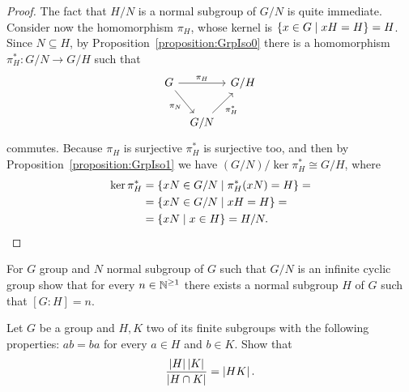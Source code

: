 \begin{proof}
The fact that \(H/N\) is a normal subgroup of \(G/N\) is quite immediate. Consider now the homomorphism \(\pi_H\), whose kernel is \(\left\{x \in G \mid xH = H\right\} = H\). Since \(N \subseteq H\), by Proposition~\ref{proposition:GrpIso0} there is a homomorphism \(\pi_H^\ast : G/N \to G/H\) such that
\[\begin{tikzcd}[column sep=tiny]
G \ar["{\pi_H}", rr] \ar["\pi_N", swap, dr] & & G/H \\
& G/N \ar["{\pi_H^\ast}", swap, ur]
\end{tikzcd}\]
commutes. Because \(\pi_H\) is surjective \(\pi_H^\ast\) is surjective too, and then by Proposition~\ref{proposition:GrpIso1} we have \((G/N)/\ker \pi_H^\ast \cong G/H\), where
\begin{align*}
\ker \pi_H^\ast &= \left\{xN \in G/N \mid \pi_H^\ast(xN) = H\right\} = \\
                &= \left\{xN \in G/N \mid xH = H\right\} = \\
                &= \left\{xN \mid x \in H\right\} = H/N .\qedhere
\end{align*}
\end{proof}

\begin{exercise}
For \(G\) group and \(N\) normal subgroup of \(G\) such that \(G/N\) is an infinite cyclic group show that for every \(n \in \mathbb N^{\ge 1}\) there exists a normal subgroup \(H\) of \(G\) such that \([G:H] = n\).
\end{exercise}

\begin{exercise}
Let \(G\) be a group and \(H, K\) two of its finite subgroups with the following properties: \(ab = ba\) for every \(a \in H\) and \(b \in K\).
Show that
\[\frac{\left\lvert H\right\rvert \left\lvert K\right\rvert}{\left\lvert H \cap K\right\rvert} = \left\lvert HK\right\rvert .\]
\end{exercise}

